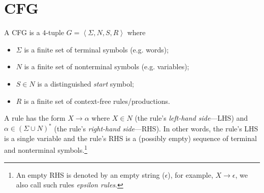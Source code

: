 \documentclass[11pt]{article}
\newcommand{\angbrack}[1]{\ensuremath{\left\langle #1 \right\rangle}}
\begin{document}
\section{CFG}


A CFG is a $4$-tuple $G = \angbrack{\Sigma, N, S, R}$ where
\begin{itemize}
	\item $\Sigma$ is a finite set of terminal symbols (e.g. words);
	\item $N$ is a finite set of nonterminal symbols (e.g. variables);
	\item $S \in N$ is a distinguished \emph{start} symbol;
	\item $R$ is a finite set of context-free rules/productions.
\end{itemize}
A rule has the form $X \rightarrow \alpha$ where $X \in N$ (the rule's \emph{left-hand side}---LHS) and $\alpha \in (\Sigma \cup N)^*$ (the rule's \emph{right-hand side}---RHS).
In other words, the rule's LHS is a single variable and the rule's RHS is a (possibly empty) sequence of terminal and nonterminal symbols.\footnote{An empty RHS is denoted by an empty string ($\epsilon$), for example, $X \rightarrow \epsilon$, we also call such rules \emph{epsilon rules}.}
\end{document}
